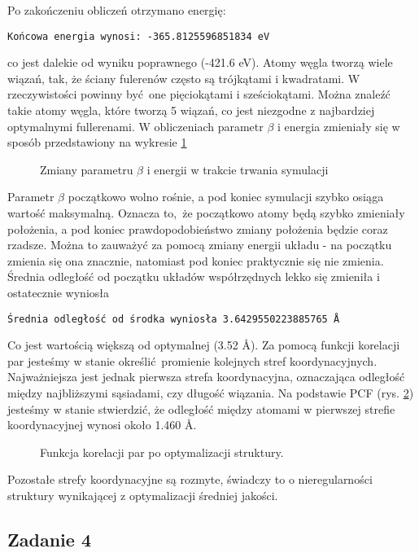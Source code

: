\documentclass[a4paper,12pt]{article}
\begin{document}
	\noindent Po zakończeniu obliczeń otrzymano energię:
	\begin{verbatim}
Końcowa energia wynosi: -365.8125596851834 eV
	\end{verbatim}	
	co jest dalekie od wyniku poprawnego (-421.6 eV). 
	Atomy węgla tworzą wiele wiązań, tak, że ściany fulerenów często są trójkątami i kwadratami. 
	W rzeczywistości powinny być one pięciokątami i sześciokątami. 
	Można znaleźć takie atomy węgla, które tworzą 5 wiązań, co jest niezgodne z najbardziej optymalnymi fullerenami.
	W obliczeniach parametr $\beta$ i energia zmieniały się w sposób przedstawiony na wykresie \ref{task3_beta}
	
	\begin{figure}[H]
		\centering
		
		\caption{Zmiany parametru $\beta$ i energii w trakcie trwania symulacji}
		\label{task3_beta}
	\end{figure}

	\noindent Parametr $\beta$ początkowo wolno rośnie, a pod koniec symulacji szybko osiąga wartość maksymalną.
	Oznacza to, że początkowo atomy będą szybko zmieniały położenia, a pod koniec prawdopodobieństwo zmiany położenia będzie coraz rzadsze.
	Można to zauważyć za pomocą zmiany energii układu - na początku zmienia się ona znacznie, natomiast pod koniec praktycznie się nie zmienia.
	Średnia odległość od początku układów współrzędnych lekko się zmieniła i ostatecznie wyniosła
	\begin{verbatim}
Średnia odległość od środka wyniosła 3.6429550223885765 Å
	\end{verbatim}
	Co jest wartością większą od optymalnej (3.52 \AA).
	Za pomocą funkcji korelacji par jesteśmy w stanie określić promienie kolejnych stref koordynacyjnych.
	Najważniejsza jest jednak pierwsza strefa koordynacyjna, oznaczająca odległość między najbliższymi sąsiadami, czy długość wiązania.
	Na podstawie PCF (rys. \ref{task3_pcf})
	jesteśmy w stanie stwierdzić, że odległość między atomami w pierwszej strefie koordynacyjnej wynosi około 1.460 \AA.
	\begin{figure}[h]
		\centering
		
		\caption{Funkcja korelacji par po optymalizacji struktury.}
		\label{task3_pcf}
	\end{figure}
	Pozostałe strefy koordynacyjne są rozmyte, świadczy to o nieregularności struktury wynikającej z optymalizacji średniej jakości.
	
	\subsection*{Zadanie 4}
\end{document}
